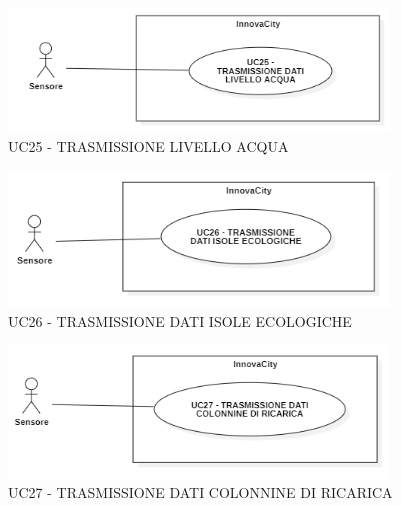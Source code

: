 
\begin{figure}[H]
    \centering
    \includegraphics[width=0.9\textwidth]{../Images/uc25.PNG}
    \caption{UC25 - TRASMISSIONE LIVELLO ACQUA}
\end{figure}



\begin{figure}[H]
    \centering
    \includegraphics[width=0.9\textwidth]{../Images/uc26.PNG}
    \caption{UC26 - TRASMISSIONE DATI ISOLE ECOLOGICHE}
\end{figure}



\begin{figure}[H]
    \centering
    \includegraphics[width=0.9\textwidth]{../Images/uc27.PNG}
    \caption{UC27 - TRASMISSIONE DATI COLONNINE DI RICARICA}
\end{figure}


